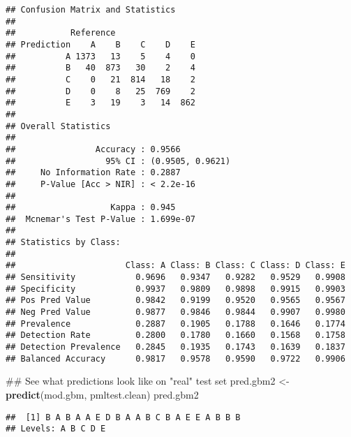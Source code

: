 \documentclass[]{article}
\newenvironment{Shaded}{\begin{snugshade}}{\end{snugshade}}
\newcommand{\KeywordTok}[1]{\textcolor[rgb]{0.13,0.29,0.53}{\textbf{{#1}}}}
\newcommand{\DataTypeTok}[1]{\textcolor[rgb]{0.13,0.29,0.53}{{#1}}}
\newcommand{\StringTok}[1]{\textcolor[rgb]{0.31,0.60,0.02}{{#1}}}
\newcommand{\NormalTok}[1]{{#1}}
\begin{document}
\begin{verbatim}
## Confusion Matrix and Statistics
## 
##           Reference
## Prediction    A    B    C    D    E
##          A 1373   13    5    4    0
##          B   40  873   30    2    4
##          C    0   21  814   18    2
##          D    0    8   25  769    2
##          E    3   19    3   14  862
## 
## Overall Statistics
##                                           
##                Accuracy : 0.9566          
##                  95% CI : (0.9505, 0.9621)
##     No Information Rate : 0.2887          
##     P-Value [Acc > NIR] : < 2.2e-16       
##                                           
##                   Kappa : 0.945           
##  Mcnemar's Test P-Value : 1.699e-07       
## 
## Statistics by Class:
## 
##                      Class: A Class: B Class: C Class: D Class: E
## Sensitivity            0.9696   0.9347   0.9282   0.9529   0.9908
## Specificity            0.9937   0.9809   0.9898   0.9915   0.9903
## Pos Pred Value         0.9842   0.9199   0.9520   0.9565   0.9567
## Neg Pred Value         0.9877   0.9846   0.9844   0.9907   0.9980
## Prevalence             0.2887   0.1905   0.1788   0.1646   0.1774
## Detection Rate         0.2800   0.1780   0.1660   0.1568   0.1758
## Detection Prevalence   0.2845   0.1935   0.1743   0.1639   0.1837
## Balanced Accuracy      0.9817   0.9578   0.9590   0.9722   0.9906
\end{verbatim}

\begin{Shaded}
\begin{Highlighting}[]
\NormalTok{## See what predictions look like on "real" test set}
\NormalTok{pred.gbm2 <-}\StringTok{ }\KeywordTok{predict}\NormalTok{(mod.gbm, pmltest.clean)}
\NormalTok{pred.gbm2}
\end{Highlighting}
\end{Shaded}

\begin{verbatim}
##  [1] B A B A A E D B A A B C B A E E A B B B
## Levels: A B C D E
\end{verbatim}

\begin{Shaded}
\end{Shaded}
\end{document}
